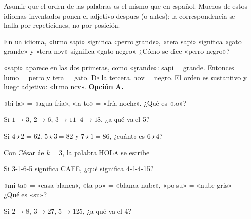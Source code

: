 \begin{trampa}
Asumir que el orden de las palabras es el mismo que en español. Muchos de estos idiomas inventados ponen el adjetivo
después (o antes); la correspondencia se halla por repeticiones, no por posición.
\end{trampa}

\begin{reto}
En un idioma, «lumo sapi» significa «perro grande», «tera sapi» significa «gato grande» y «tera nov» significa «gato
negro». ¿Cómo se dice «perro negro»?
\end{reto}

\begin{retoresuelto}
«sapi» aparece en las dos primeras, como «grande»: sapi = grande. Entonces lumo = perro y tera = gato. De la tercera,
nov = negro. El orden es sustantivo y luego adjetivo: «lumo nov». \textbf{Opción A.}
\end{retoresuelto}

\taller
{}
\begin{ejercicios}
\item «bi la» = «agua fría», «la to» = «fría noche». ¿Qué es «to»? 
\item Si $1 \to 3$, $2 \to 6$, $3 \to 11$, $4 \to 18$, ¿a qué va el 5? 
\end{ejercicios}
\begin{ejercicios}
\item Si $4 \star 2 = 62$, $5 \star 3 = 82$ y $7 \star 1 = 86$, ¿cuánto es $6 \star 4$?
\end{ejercicios}

\bitacora

\evaluacion
\begin{ejercicios}
\item Con César de $k = 3$, la palabra HOLA se escribe
\item Si 3-1-6-5 significa CAFE, ¿qué significa 4-1-4-15?
\item «mi ta» = «casa blanca», «ta po» = «blanca nube», «po su» = «nube gris». ¿Qué es «su»?
\item Si $2 \to 8$, $3 \to 27$, $5 \to 125$, ¿a qué va el 4?
\end{ejercicios}
